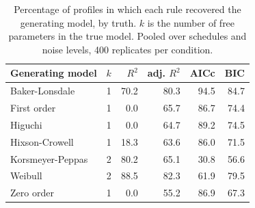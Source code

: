 \begin{table}[t]
\centering
\small
\caption{Percentage of profiles in which each rule recovered the generating model, by truth. $k$ is the number of free parameters in the true model. Pooled over schedules and noise levels, 400 replicates per condition.}
\label{tab:selection}
\begin{tabular}{lcrrrr}
\toprule
Generating model & $k$ & $R^2$ & adj. $R^2$ & AICc & BIC \\
\midrule
Baker-Lonsdale & 1 & 70.2 & 80.3 & 94.5 & 84.7 \\
First order & 1 & 0.0 & 65.7 & 86.7 & 74.4 \\
Higuchi & 1 & 0.0 & 64.7 & 89.2 & 74.5 \\
Hixson-Crowell & 1 & 18.3 & 63.6 & 86.0 & 71.5 \\
Korsmeyer-Peppas & 2 & 80.2 & 65.1 & 30.8 & 56.6 \\
Weibull & 2 & 88.5 & 82.3 & 61.9 & 79.5 \\
Zero order & 1 & 0.0 & 55.2 & 86.9 & 67.3 \\
\bottomrule
\end{tabular}
\end{table}
